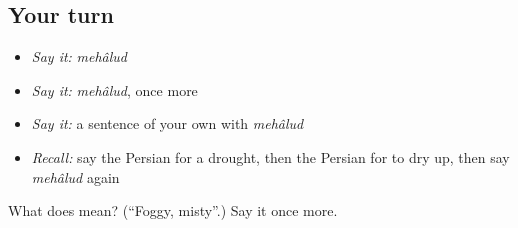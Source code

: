 \subsection*{Your turn}
\begin{itemize}
\raggedright
  \item \emph{Say it:} \emph{mehâlud}
  \item \emph{Say it:} \emph{mehâlud}, once more
  \item \emph{Say it:} a sentence of your own with \emph{mehâlud}
  \item \emph{Recall:} say the Persian for a drought, then the Persian for to dry up, then say \emph{mehâlud} again
\end{itemize}

\begin{tcolorbox}[breakable,colback=teal!4,colframe=teal!35!black,title={Before you move on}]
What does   mean? (\textquotedblleft{}Foggy, misty\textquotedblright{}.) Say it once more.
\end{tcolorbox}

